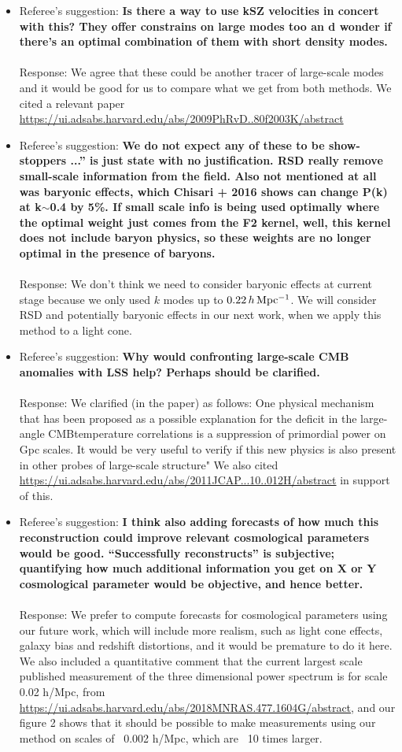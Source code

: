 \documentclass{article}
\begin{document}
\begin{itemize}
\item Referee's suggestion: \textbf{Is there a way to use kSZ velocities in concert with this? They offer constrains on large modes too an d wonder if there’s an optimal combination of them with short density modes.}
\\ \\Response: We agree that these could be another tracer of large-scale modes and it would be good for us to compare what we get from both methods. We cited a relevant paper \url{https://ui.adsabs.harvard.edu/abs/2009PhRvD..80f2003K/abstract}
\item Referee's suggestion: \textbf{We do not expect any of these to be show-stoppers ...” is just state with no justification. RSD really remove small-scale information from the field. Also not mentioned at all was baryonic effects, which Chisari + 2016 shows can change P(k) at k$\sim$0.4 by 5\%. If small scale info is being used optimally where the optimal weight just comes from the F2 kernel, well, this kernel does not include baryon physics, so these weights are no longer optimal in the presence of baryons.}
\\ \\Response: We don't think we need to consider baryonic effects at current stage because we only used $k$ modes up to $0.22 \, h \,\rm Mpc^{-1}$. We will consider RSD and potentially baryonic effects in our next work, when we apply this method to a light cone.
\item Referee's suggestion: \textbf{Why would confronting large-scale CMB anomalies with LSS help? Perhaps should be clarified.}
\\ \\Response: We clarified (in the paper) as follows: One physical mechanism that has been proposed as a possible explanation for the deficit in the large-angle CMBtemperature correlations is a suppression of primordial power on ~ Gpc scales. It would be very useful to verify if this new physics is also present in other probes of large-scale structure"  We also cited \url{https://ui.adsabs.harvard.edu/abs/2011JCAP...10..012H/abstract} in support of this.
\item Referee's suggestion: \textbf{I think also adding forecasts of how much this reconstruction could improve relevant cosmological parameters would be good. “Successfully reconstructs” is subjective; quantifying how much additional information you get on X or Y cosmological parameter would be objective, and hence better.}
\\ \\Response: We prefer to compute forecasts for cosmological parameters using our future work, which will include more realism, such as light cone effects, galaxy bias and redshift distortions, and it would be premature to do it here. We also included a quantitative comment that the current largest scale published measurement of the three dimensional power spectrum is for scale 0.02 h/Mpc, from \url{https://ui.adsabs.harvard.edu/abs/2018MNRAS.477.1604G/abstract}, and our figure 2 shows that it should be possible to make measurements using our method on scales of ~0.002 h/Mpc, which are ~10 times larger.


\end{itemize}
\end{document}
